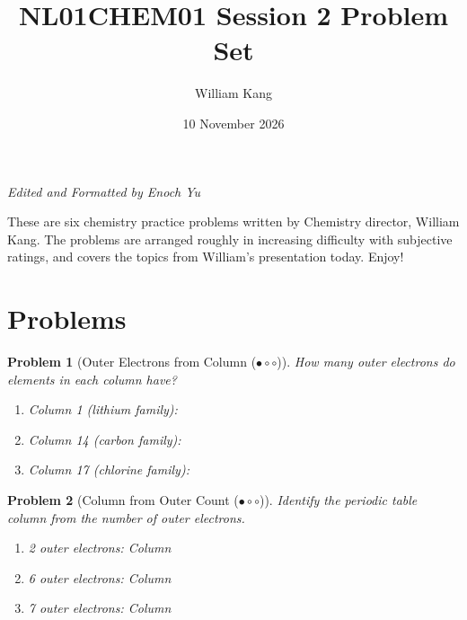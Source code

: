 \documentclass[a4paper,11pt]{article}
\title{\textbf{NL01CHEM01 Session 2 Problem Set}}
\date{10 November 2026}
\author{William Kang}
\newcommand{\easy}{(\ensuremath{\bullet \circ \circ})}
\theoremstyle{listprobstyle}
\newtheorem{problem}{Problem}
\begin{document}
\maketitle
\begin{center}
    \small\textit{Edited and Formatted by Enoch Yu}
\end{center}

\vspace{\baselineskip}
\begin{center}
\begin{minipage}{0.7\textwidth}
These are six chemistry practice problems written by Chemistry
director, William Kang. The problems are arranged roughly in
increasing difficulty with subjective ratings, and covers the topics
from William's presentation today. Enjoy!
\end{minipage}
\end{center}
\vspace{\baselineskip}

\section{Problems}
\begin{problem}[Outer Electrons from Column \easy]
How many outer electrons do elements in each column have?
\vspace{-0.6\baselineskip}
\begin{enumerate}[label=\alph*),itemsep=0pt,parsep=0pt,topsep=0pt]
\item Column 1 (lithium family): \underline{\phantom{XXX}}
\item Column 14 (carbon family): \underline{\phantom{XXX}}
\item Column 17 (chlorine family): \underline{\phantom{XXX}}
\end{enumerate}
\end{problem}

\begin{problem}[Column from Outer Count \easy]
Identify the periodic table column from the number of outer electrons.
\vspace{-0.6\baselineskip}
\begin{enumerate}[label=\alph*),itemsep=0pt,parsep=0pt,topsep=0pt]
\item 2 outer electrons: Column \underline{\phantom{XXX}}
\item 6 outer electrons: Column \underline{\phantom{XXX}}
\item 7 outer electrons: Column \underline{\phantom{XXX}}
\end{enumerate}
\end{problem}
\end{document}
